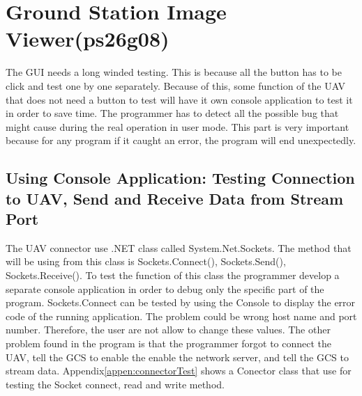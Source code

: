 \section{Ground Station Image Viewer(ps26g08)}
The GUI needs a long winded testing. This is because all the button has to be click and test one by one separately. Because of this, some function of the UAV that does not need a button to test will have it own console application to test it in order to save time. The programmer has to detect all the possible bug that might cause during the real operation in user mode. This part is very important because for any program if it caught an error, the program will end unexpectedly.
\subsection{Using Console Application: Testing Connection to UAV, Send and Receive Data from Stream Port}

The UAV connector use .NET class called System.Net.Sockets. The method that will be using from this class is Sockets.Connect(), Sockets.Send(), Sockets.Receive(). To test the function of this class the programmer develop a separate console application in order to debug only the specific part of the program. Sockets.Connect can be tested by using the Console to display the error code of the running application. The problem could be wrong host name and port number. Therefore, the user are not allow to change these values. The other problem found in the program is that the programmer forgot to connect the UAV, tell the GCS to enable the enable the network server, and tell the GCS to stream data. Appendix\ref{appen:connectorTest} shows a Conector class that use for testing the Socket connect, read and write method.

